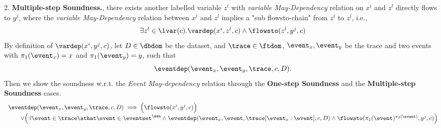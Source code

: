   2. \textbf{Multiple-step Soundness.}, 
  there exists another labelled variable $z^l$ with \emph{variable May-Dependency} relation on $x^i$ and 
  $z^l$ directly flows to $y^j$, where the \emph{variable May-Dependency} relation between $x^i$ and $z^l$
   implies a "sub flowsto-chain" from $z^i$ to $z^l$, 
  i.e., 
  \[
    \begin{array}{l}
    \exists z^l \in \lvar(c).
    \vardep(x^i, z^l, {c})   
  \land  \flowsto(z^l, y^j, {c})
\end{array}
    \]
%
%
By definition of $\vardep(x^i, y^j, {c})$, 
let $D \in \dbdom$ be the dataset,
and $\trace \in \ftdom$, $\event_x, \event_y$ be the trace and two events 
with $\pi_1(\event_x) = x$ and $\pi_1(\event_y) = y$,
such that
\[ \eventdep(\event_x, \event_y, \trace, c, D). 
  \]
Then we show the soundness w.r.t. the \emph{Event May-dependency} relation
through the
\textbf{One-step Soundness} and the \textbf{Multiple-step Soundness} cases.
\[
  \begin{array}{l}
    \eventdep(\event_x, \event_y, \trace, c, D)
    \implies
      \Big( 
      \flowsto(x^i, y^j, c) 
      \Big)
\\ \qquad \lor
\Big( 
  \exists \event \in \trace \sthat  
  \event \in \eventset^{\asn}
  \land
  \eventdep(\event_x, \event, \trace[\event_x:\event], c, D)
  \land 
\flowsto(\pi_1(\event)^{\pi_2(\event)}, y^j, c) 
\Big)
\end{array}
  \]
